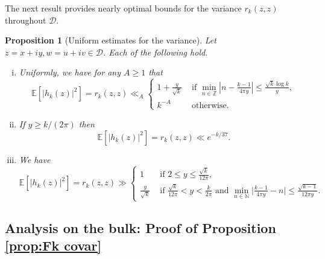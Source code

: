 \documentclass[12pt, a4paper]{amsart}
\newtheorem{proposition}[theorem]{Proposition}
\theoremstyle{definition}
\newcommand {\E} {\mathbb{E}}
\newcommand {\1} {\mathbf{1}}
\newcommand {\Dc} {\mathcal{D}}
\numberwithin{equation}{section}
\begin{document}





The next result provides nearly optimal bounds
for the variance $r_k(z,z)$ throughout $\Dc$.

\begin{proposition}[Uniform estimates for the variance] \label{prop:nearthecusp}
Let $z=x+iy, w=u+iv \in \Dc$. Each of the following hold.
\begin{enumerate}[i.]
\item Uniformly, we have for any $A \ge 1$ that
\[
\E\left[ \left| h_{k}(z) \right|^{2}\right]=r_k(z,z) \ll_A \begin{cases}
1+\frac{y}{\sqrt{k}} & \text{ if }
\min_{n \in \mathbb Z} | n-\frac{k-1}{4\pi y}| \le \frac{\sqrt{k} \log k}{y}, \\
k^{-A} & \text{ otherwise.}
\end{cases}
\]
\item If $y \ge k/(2\pi)$ then \[\E\left[ \left| h_{k}(z) \right|^{2}\right]=r_k(z,z) \ll e^{-k/37}.\]
\item We have
\[
\E\left[ \left| h_{k}(z) \right|^{2}\right]=r_k(z,z)\gg \displaystyle\begin{cases}
1 & \text{ if }  2 \le y \le \frac{\sqrt{k}}{12\pi}, \\
\frac{y}{\sqrt{k}} & \text{ if }  \frac{\sqrt{k}}{12\pi} < y < \frac{k}{2\pi}  \text{ and } \min_{n \in \mathbb N } \big|\frac{k-1}{4\pi y}-n\big| \le \frac{\sqrt{k-1}}{12 \pi y}.
\end{cases}
\]
\end{enumerate}
\end{proposition}



\subsection{Analysis on the bulk: Proof of Proposition \ref{prop:Fk covar}} \label{sec:bergman}
\end{document}
